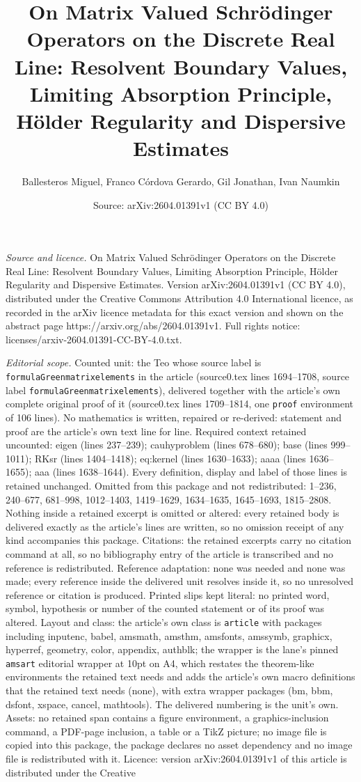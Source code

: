 \documentclass[10pt,a4paper]{amsart}
\title[On Matrix Valued Schr\"odinger Operators on the Discrete Rea]{On Matrix Valued Schr\"odinger Operators on the Discrete Real Line: Resolvent Boundary Values, Limiting Absorption Principle, H\"older Regularity and Dispersive Estimates}
\author{Ballesteros Miguel, Franco C\'ordova Gerardo, Gil Jonathan, Ivan Naumkin}
\date{Source: arXiv:2604.01391v1 (CC BY 4.0)}
\begin{document}
\maketitle

\noindent\emph{Source and licence.} On Matrix Valued Schr\"odinger Operators on the Discrete Real Line: Resolvent Boundary Values, Limiting Absorption Principle, H\"older Regularity and Dispersive Estimates. Version arXiv:2604.01391v1 (CC BY 4.0), distributed under the Creative Commons Attribution 4.0 International licence, as recorded in the arXiv licence metadata for this exact version and shown on the abstract page https://arxiv.org/abs/2604.01391v1. Full rights notice: licenses/arxiv-2604.01391-CC-BY-4.0.txt.\par\smallskip

\noindent\textit{Editorial scope.} Counted unit: the Teo whose source label is \texttt{formulaGreenmatrixelements} in the article (source0.tex lines 1694--1708, source label \texttt{formulaGreenmatrixelements}), delivered together with the article's own complete original proof of it (source0.tex lines 1709--1814, one \texttt{proof} environment of 106 lines). No mathematics is written, repaired or re-derived: statement and proof are the article's own text line for line. Required context retained uncounted: eigen (lines 237--239); cauhyproblem (lines 678--680); base (lines 999--1011); RKsr (lines 1404--1418); eq:kernel (lines 1630--1633); aaaa (lines 1636--1655); aaa (lines 1638--1644). Every definition, display and label of those lines is retained unchanged. Omitted from this package and not redistributed: 1--236, 240--677, 681--998, 1012--1403, 1419--1629, 1634--1635, 1645--1693, 1815--2808. Nothing inside a retained excerpt is omitted or altered: every retained body is delivered exactly as the article's lines are written, so no omission receipt of any kind accompanies this package. Citations: the retained excerpts carry no citation command at all, so no bibliography entry of the article is transcribed and no reference is redistributed. Reference adaptation: none was needed and none was made; every reference inside the delivered unit resolves inside it, so no unresolved reference or citation is produced. Printed slips kept literal: no printed word, symbol, hypothesis or number of the counted statement or of its proof was altered. Layout and class: the article's own class is \texttt{article} with packages including inputenc, babel, amsmath, amsthm, amsfonts, amssymb, graphicx, hyperref, geometry, color, appendix, authblk; the wrapper is the lane's pinned \texttt{amsart} editorial wrapper at 10pt on A4, which restates the theorem-like environments the retained text needs and adds the article's own macro definitions that the retained text needs (none), with extra wrapper packages (bm, bbm, dsfont, xspace, cancel, mathtools). The delivered numbering is the unit's own. Assets: no retained span contains a figure environment, a graphics-inclusion command, a PDF-page inclusion, a table or a TikZ picture; no image file is copied into this package, the package declares no asset dependency and no image file is redistributed with it. Licence: version arXiv:2604.01391v1 of this article is distributed under the Creative 
\end{document}
